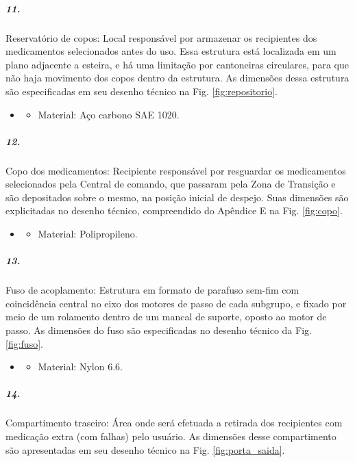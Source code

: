 \subparagraph*{11.}\label{retorno_reservatorio}
Reservatório de copos: Local responsável por armazenar os recipientes dos medicamentos selecionados antes do uso. Essa estrutura está localizada em um plano adjacente a esteira, e há uma limitação por cantoneiras circulares, para que não haja movimento dos copos dentro da estrutura. As dimensões dessa estrutura são especificadas em seu desenho técnico na Fig. \ref{fig:repositorio}.

\begin{itemize}
   \item[]
   \begin{itemize}
       \item  Material: Aço carbono SAE 1020.
   \end{itemize}
   \end{itemize}
  

\subparagraph*{12.} \label{retorno_copo}
Copo dos medicamentos: Recipiente responsável por resguardar os medicamentos selecionados pela Central de comando, que passaram pela Zona de Transição e são depositados sobre o mesmo, na posição inicial de despejo. Suas dimensões são explicitadas no desenho técnico, compreendido do Apêndice E na Fig. \ref{fig:copo}.

\begin{itemize}
   \item[]
   \begin{itemize}
       \item Material: Polipropileno.
   \end{itemize}
   \end{itemize}


\subparagraph*{13.}\label{retorno_fuso}
Fuso de acoplamento: Estrutura em formato de parafuso sem-fim com coincidência central no eixo dos motores de passo de cada subgrupo, e fixado por meio de um rolamento dentro de um mancal de suporte, oposto ao motor de passo. As dimensões do fuso são especificadas no desenho técnico da Fig.  \ref{fig:fuso}.

\begin{itemize}
   \item[]
   \begin{itemize}
       \item Material: Nylon 6.6.
   \end{itemize}
   \end{itemize}
 

\subparagraph*{14.} \label{retorno_porta}
Compartimento traseiro: Área onde será efetuada a retirada dos recipientes com medicação extra (com falhas) pelo usuário. As dimensões desse compartimento são apresentadas em seu desenho técnico na Fig. \ref{fig:porta_saida}.

